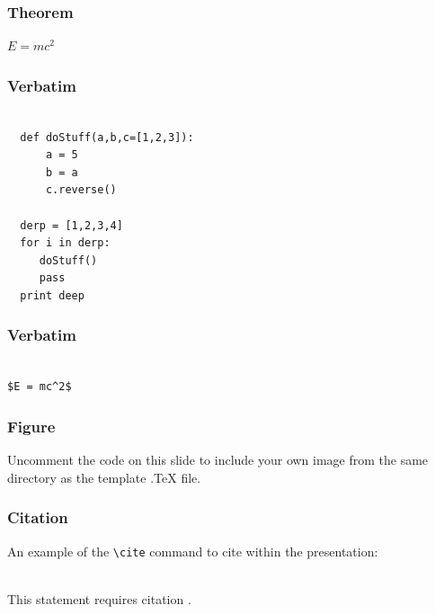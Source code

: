 \documentclass{beamer}
\begin{document}

\begin{frame}
\frametitle{Theorem}
\begin{theorem}
$E = mc^2$
\end{theorem}
\end{frame}



\begin{frame}[fragile] %
\frametitle{Verbatim}
\begin{example}
\begin{verbatim}

  def doStuff(a,b,c=[1,2,3]):
      a = 5
      b = a 
      c.reverse()
  
  derp = [1,2,3,4]
  for i in derp:
     doStuff()
     pass
  print deep

\end{verbatim}
\end{example}
\end{frame}


\begin{frame}[fragile] %
\frametitle{Verbatim}
\begin{example}
\begin{verbatim}

$E = mc^2$

\end{verbatim}
\end{example}
\end{frame}


\begin{frame}
\frametitle{Figure}
Uncomment the code on this slide to include your own image from the same directory as the template .TeX file.
\end{frame}


\begin{frame}[fragile] %
\frametitle{Citation}
An example of the \verb|\cite| command to cite within the presentation:\\~

This statement requires citation \cite{p1}.
\end{frame}
\end{document}
